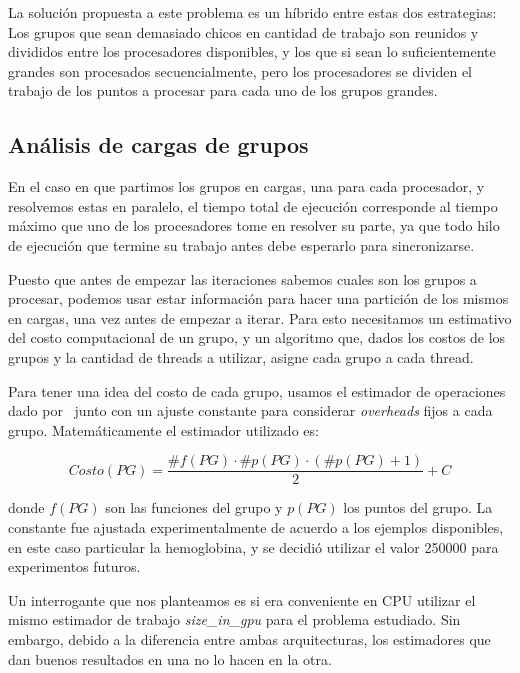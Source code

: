 La soluci\'on propuesta a este problema es un h\'ibrido entre estas dos
estrategias: Los grupos que sean demasiado chicos en cantidad de trabajo son
reunidos y divididos entre los procesadores disponibles, y los que si sean lo
suficientemente grandes son procesados secuencialmente, pero los procesadores se
dividen el trabajo de los puntos a procesar para cada uno de los grupos grandes.

\subsection{An\'alisis de cargas de grupos}
\label{PredictorCPU}

En el caso en que partimos los grupos en cargas, una para cada procesador, y
resolvemos estas en paralelo, el tiempo total de ejecuci\'on corresponde al tiempo m\'aximo
que uno de los procesadores tome en resolver su parte, ya que todo hilo de
ejecuci\'on que termine su trabajo antes debe esperarlo para sincronizarse.

Puesto que antes de empezar las iteraciones sabemos cuales son los grupos a
procesar, podemos usar estar informaci\'on para hacer una partici\'on de los mismos
en cargas, una vez antes de empezar a iterar. Para esto necesitamos un estimativo del costo
computacional de un grupo, y un algoritmo que, dados los costos de los grupos y la cantidad de threads a
utilizar, asigne cada grupo a cada thread.

Para tener una idea del costo de cada grupo, usamos el estimador de operaciones
dado por~\cite{Nitsche2014} junto con un ajuste constante para considerar \textit{overheads} fijos a
cada grupo. Matem\'aticamente el estimador utilizado es:

\begin{equation}
    Costo(PG) = \frac{\#f(PG) \cdot \#p(PG) \cdot (\#p(PG) + 1)}{2} + C
\end{equation}

donde $f(PG)$ son las funciones del grupo y $p(PG)$ los puntos del grupo. La
constante fue ajustada experimentalmente de acuerdo a los ejemplos disponibles,
en este caso particular la hemoglobina, y se decidi\'o utilizar el valor 250000
para experimentos futuros.

Un interrogante que nos planteamos es si era conveniente en CPU utilizar el mismo
estimador de trabajo \textit{size\_in\_gpu} para el problema estudiado. Sin
embargo, debido a la diferencia entre ambas arquitecturas, los estimadores que
dan buenos resultados en una no lo hacen en la otra.

